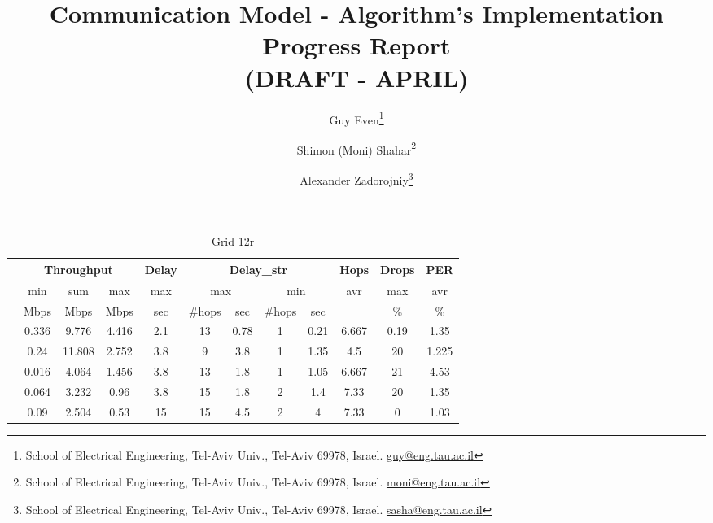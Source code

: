 \documentclass[11pt, a4paper]{article}
\newcommand{\algA}{\text{Main}}
\newcommand{\algB}{\text{Shortest}}
\newcommand{\algC}{\text{MainNoSched}}
\newcommand{\algD}{\text{MFNoSched}}
\newcommand{\algE}{\text{MFSched}}
\begin{document}
  \title{Communication Model - Algorithm's Implementation Progress Report
 \\ {\small \textsc{(DRAFT - APRIL)}}
}
\author{%
Guy Even\thanks{School of Electrical Engineering,
Tel-Aviv Univ., Tel-Aviv 69978, Israel.
\protect\url{guy@eng.tau.ac.il}}
\and
Shimon (Moni) Shahar\thanks{School of Electrical Engineering,
Tel-Aviv Univ., Tel-Aviv 69978, Israel.
\protect\url{moni@eng.tau.ac.il}}
\and
Alexander Zadorojniy\thanks{School of Electrical Engineering,
Tel-Aviv Univ., Tel-Aviv 69978, Israel.
\protect\url{sasha@eng.tau.ac.il}}
%
}

\begin{table}
\centering\small
\begin{tabular}{|| l || c | c | c | c|| c | c || c | c || c | c | c ||}
\hline
& \multicolumn{3}{|c|}{Throughput}  & Delay & \multicolumn{4}{|c||}{Delay\_str} & Hops & Drops & PER \\
\hline
& min & sum & max & max & \multicolumn{2}{|c||}{max} & \multicolumn{2}{|c||}{min} & avr & max & avr \\
\hline
& Mbps & Mbps & Mbps & sec & \#hops & sec & \#hops & sec & & \% & \% \\
\hline\hline
\algA & 0.336 & 9.776  & 4.416 & 2.1 & 13 & 0.78 & 1 & 0.21 & 6.667 & 0.19 & 1.35 \\
\algB & 0.24  & 11.808 & 2.752 & 3.8 & 9  & 3.8  & 1 & 1.35 & 4.5   & 20   & 1.225 \\
\algC & 0.016 & 4.064  & 1.456 & 3.8 & 13 & 1.8  & 1 & 1.05 & 6.667 & 21   & 4.53 \\
\algD & 0.064 & 3.232  & 0.96  & 3.8 & 15 & 1.8  & 2 & 1.4  & 7.33  & 20   & 1.35 \\
\algE & 0.09  & 2.504  & 0.53  & 15  & 15 & 4.5  & 2 & 4    & 7.33  &  0   & 1.03 \\
\hline
\end{tabular}
\caption{Grid 12r}
\label{table_mcs}
\end{table}
\end{document}
